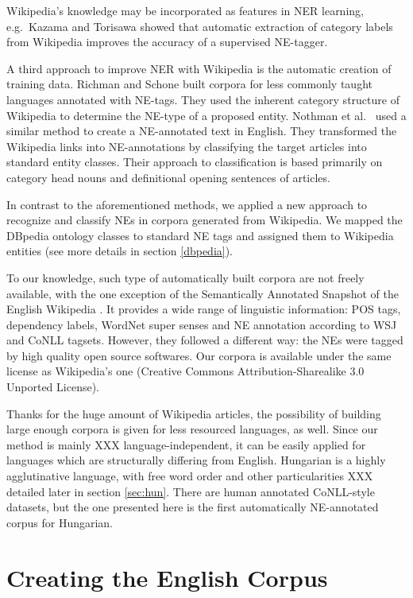 \documentclass[11pt]{article}
\begin{document}
Wikipedia's knowledge may be incorporated as features in NER learning, e.g.~Kazama and Torisawa  showed that automatic extraction of category labels from Wikipedia improves the accuracy of a supervised NE-tagger. 

A third approach to improve NER with Wikipedia is the automatic creation of training data. Richman and Schone  built corpora for less commonly taught languages annotated with NE-tags. They used the inherent category structure of Wikipedia to determine the NE-type of a proposed entity. Nothman et al.~ used a similar method to create a NE-annotated text in English. They transformed the Wikipedia links into NE-annotations by classifying the target articles into standard entity classes. Their approach to classification is based primarily on category head nouns and definitional opening sentences of articles. 

In contrast to the aforementioned methods, we applied a new approach to recognize and classify NEs in corpora generated from Wikipedia. We mapped the DBpedia ontology classes to standard NE tags and assigned them to Wikipedia entities (see more details in section \ref{dbpedia}).

To our knowledge, such type of automatically built corpora are not freely available, with the one exception of the Semantically Annotated Snapshot of the English Wikipedia \cite{Zaragoza:07}. It provides a wide range of linguistic information: POS tags, dependency labels, WordNet super senses and NE annotation according to WSJ and CoNLL tagsets. However, they followed a different way: the NEs were tagged by high quality open source softwares. Our corpora is available under the same license as Wikipedia's one (Creative Commons Attribution-Sharealike 3.0 Unported License).

Thanks for the huge amount of Wikipedia articles, the possibility of building large enough 
corpora is given for less resourced languages, as well. Since our method is mainly XXX language-independent, it can be easily applied for languages which are structurally differing from English. Hungarian is a highly agglutinative language, with free word order and other particularities XXX detailed later in section \ref{sec:hun}. There are human annotated CoNLL-style datasets, but the one presented here is the first automatically NE-annotated corpus for Hungarian. 

\section{Creating the English Corpus} 
\label{sec:create}
\end{document}
